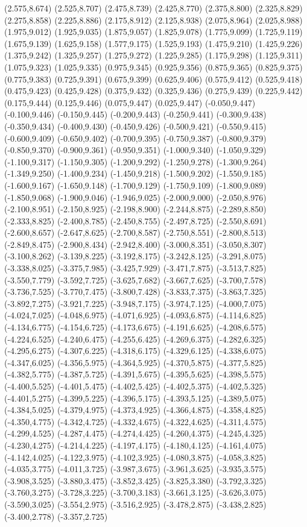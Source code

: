(2.575,8.674) (2.525,8.707) (2.475,8.739) (2.425,8.770) (2.375,8.800) (2.325,8.829) (2.275,8.858) (2.225,8.886) (2.175,8.912) (2.125,8.938) (2.075,8.964) (2.025,8.988) (1.975,9.012) (1.925,9.035) (1.875,9.057) (1.825,9.078) (1.775,9.099) (1.725,9.119) (1.675,9.139) (1.625,9.158) (1.577,9.175) (1.525,9.193) (1.475,9.210) (1.425,9.226) (1.375,9.242) (1.325,9.257) (1.275,9.272) (1.225,9.285) (1.175,9.298) (1.125,9.311) (1.075,9.323) (1.025,9.335) (0.975,9.345) (0.925,9.356) (0.875,9.365) (0.825,9.375) (0.775,9.383) (0.725,9.391) (0.675,9.399) (0.625,9.406) (0.575,9.412) (0.525,9.418) (0.475,9.423) (0.425,9.428) (0.375,9.432) (0.325,9.436) (0.275,9.439) (0.225,9.442) (0.175,9.444) (0.125,9.446) (0.075,9.447) (0.025,9.447) (-0.050,9.447) (-0.100,9.446) (-0.150,9.445) (-0.200,9.443) (-0.250,9.441) (-0.300,9.438) (-0.350,9.434) (-0.400,9.430) (-0.450,9.426) (-0.500,9.421) (-0.550,9.415) (-0.600,9.409) (-0.650,9.402) (-0.700,9.395) (-0.750,9.387) (-0.800,9.379) (-0.850,9.370) (-0.900,9.361) (-0.950,9.351) (-1.000,9.340) (-1.050,9.329) (-1.100,9.317) (-1.150,9.305) (-1.200,9.292) (-1.250,9.278) (-1.300,9.264) (-1.349,9.250) (-1.400,9.234) (-1.450,9.218) (-1.500,9.202) (-1.550,9.185) (-1.600,9.167) (-1.650,9.148) (-1.700,9.129) (-1.750,9.109) (-1.800,9.089) (-1.850,9.068) (-1.900,9.046) (-1.946,9.025) (-2.000,9.000) (-2.050,8.976) (-2.100,8.951) (-2.150,8.925) (-2.198,8.900) (-2.244,8.875) (-2.289,8.850) (-2.333,8.825) (-2.400,8.785) (-2.450,8.755) (-2.497,8.725) (-2.550,8.691) (-2.600,8.657) (-2.647,8.625) (-2.700,8.587) (-2.750,8.551) (-2.800,8.513) (-2.849,8.475) (-2.900,8.434) (-2.942,8.400) (-3.000,8.351) (-3.050,8.307) (-3.100,8.262) (-3.139,8.225) (-3.192,8.175) (-3.242,8.125) (-3.291,8.075) (-3.338,8.025) (-3.375,7.985) (-3.425,7.929) (-3.471,7.875) (-3.513,7.825) (-3.550,7.779) (-3.592,7.725) (-3.625,7.682) (-3.667,7.625) (-3.700,7.578) (-3.736,7.525) (-3.770,7.475) (-3.800,7.428) (-3.833,7.375) (-3.863,7.325) (-3.892,7.275) (-3.921,7.225) (-3.948,7.175) (-3.974,7.125) (-4.000,7.075) (-4.024,7.025) (-4.048,6.975) (-4.071,6.925) (-4.093,6.875) (-4.114,6.825) (-4.134,6.775) (-4.154,6.725) (-4.173,6.675) (-4.191,6.625) (-4.208,6.575) (-4.224,6.525) (-4.240,6.475) (-4.255,6.425) (-4.269,6.375) (-4.282,6.325) (-4.295,6.275) (-4.307,6.225) (-4.318,6.175) (-4.329,6.125) (-4.338,6.075) (-4.347,6.025) (-4.356,5.975) (-4.364,5.925) (-4.370,5.875) (-4.377,5.825) (-4.382,5.775) (-4.387,5.725) (-4.391,5.675) (-4.395,5.625) (-4.398,5.575) (-4.400,5.525) (-4.401,5.475) (-4.402,5.425) (-4.402,5.375) (-4.402,5.325) (-4.401,5.275) (-4.399,5.225) (-4.396,5.175) (-4.393,5.125) (-4.389,5.075) (-4.384,5.025) (-4.379,4.975) (-4.373,4.925) (-4.366,4.875) (-4.358,4.825) (-4.350,4.775) (-4.342,4.725) (-4.332,4.675) (-4.322,4.625) (-4.311,4.575) (-4.299,4.525) (-4.287,4.475) (-4.274,4.425) (-4.260,4.375) (-4.245,4.325) (-4.230,4.275) (-4.214,4.225) (-4.197,4.175) (-4.180,4.125) (-4.161,4.075) (-4.142,4.025) (-4.122,3.975) (-4.102,3.925) (-4.080,3.875) (-4.058,3.825) (-4.035,3.775) (-4.011,3.725) (-3.987,3.675) (-3.961,3.625) (-3.935,3.575) (-3.908,3.525) (-3.880,3.475) (-3.852,3.425) (-3.825,3.380) (-3.792,3.325) (-3.760,3.275) (-3.728,3.225) (-3.700,3.183) (-3.661,3.125) (-3.626,3.075) (-3.590,3.025) (-3.554,2.975) (-3.516,2.925) (-3.478,2.875) (-3.438,2.825) (-3.400,2.778) (-3.357,2.725) 